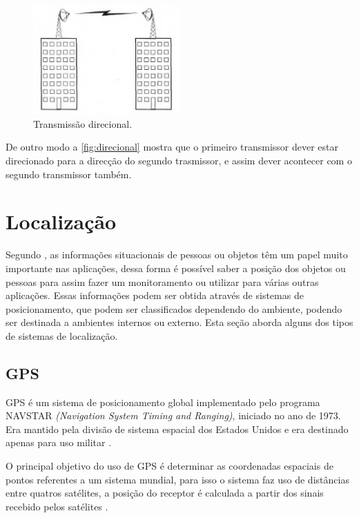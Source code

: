 \begin{itemize}
        \begin{figure}[H]
              \caption{\label{fig:direcional}{Transmissão direcional.}}
              \centering
              \includegraphics[width=0.5\textwidth]{Figuras/transmissao_radio_direcional.PNG}
        \end{figure}
        \par
        De outro modo a \autoref{fig:direcional} mostra que o primeiro transmissor dever estar direcionado para a direcção do segundo trasmissor, e assim dever acontecer com o segundo transmissor também.
        \end{itemize}    
\section{Localização}
\par
Segundo \citeauthor{rfid2009review}, as informações situacionais de pessoas ou objetos têm um papel muito importante nas aplicações, dessa forma é possível saber a posição dos objetos ou pessoas para assim fazer um monitoramento ou utilizar para várias outras aplicações. Essas informações podem ser obtida através de sistemas de posicionamento, que podem ser classificados dependendo do ambiente, podendo ser destinada a ambientes internos ou externo. Esta seção aborda alguns dos tipos de sistemas de localização.
    \subsection{GPS}
    \par
    GPS é um sistema de posicionamento global implementado pelo programa NAVSTAR \textit{(Navigation System Timing and Ranging)}, iniciado no ano de 1973. Era mantido pela divisão de sistema espacial dos Estados Unidos e era destinado apenas para uso militar \cite{gpsEduardo2005}.
    \par
   O principal objetivo do uso de GPS é determinar as coordenadas espaciais de pontos referentes a um sistema mundial, para isso o sistema faz uso de distâncias entre quatros satélites, a posição do receptor é calculada a partir dos sinais recebido pelos satélites \cite{gpsEduardo2005}.


